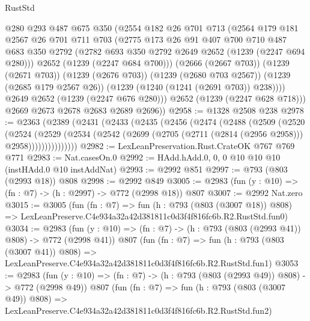 \begin{lexlean}{RustStd}
\begin{coremodule}
            @280
            @293
            @487
            @675
            @350
            (@2554
              @182
              @26
              @701
              @713
              (@2564
                @179
                @181
                @2567
                @26
                @701
                @711
                @703
                (@2775
                  @173
                  @26
                  @91
                  @407
                  @700
                  @710
                  @487
                  @683
                  @350
                  @2792
                  (@2782 @693 @350 @2792 @2649 @2652 (@1239 (@2247 @694 @280)))
                  @2652
                  (@1239 (@2247 @684 @700)))
                (@2666 (@2667 @703))
                (@1239 (@2671 @703))
                (@1239 (@2676 @703))
                (@1239 (@2680 @703 @2567))
                (@1239 (@2685 @179 @2567 @26))
                (@1239 (@1240 (@1241 (@2691 @703)) @238))))
            @2649
            @2652
            (@1239 (@2247 @676 @280)))
          @2652
          (@1239 (@2247 @628 @718)))
        @2669
        @2673
        @2678
        @2683
        @2689
        @2696))
@2958 := @1328 @2508 @238
@2978 := @2363
    (@2389
      (@2431
        (@2433
          (@2435
            (@2456
              (@2474
                (@2488
                  (@2509
                    (@2520
                      (@2524
                        (@2529
                          (@2534
                            (@2542 (@2699 (@2705 (@2711 (@2814 (@2956 @2958))) @2958)))))))))))))))
@2982 := LexLeanPreservation.Rust.CrateOK @767 @769 @771
@2983 := Nat.casesOn.{0}
@2992 := HAdd.hAdd.{0, 0, 0} @10 @10 @10 (instHAdd.{0} @10 instAddNat)
@2993 := @2992 @851
@2997 := @793 (@803 (@2993 @18)) @808
@2998 := @2992 @849
@3005 := @2983 (fun (y : @10) => (fn : @7) -> (h : @2997) -> @772 (@2998 @18)) @807
@3007 := @2992 Nat.zero
@3015 := @3005
    (fun (fn : @7) =>
    fun (h : @793 (@803 (@3007 @18)) @808) =>
    LexLeanPreserve.C4e934a32a42d381811c0d3f4f816fc6b.R2.RustStd.fun0)
@3034 := @2983
    (fun (y : @10) => (fn : @7) -> (h : @793 (@803 (@2993 @41)) @808) -> @772 (@2998 @41))
    @807
    (fun (fn : @7) =>
    fun (h : @793 (@803 (@3007 @41)) @808) =>
    LexLeanPreserve.C4e934a32a42d381811c0d3f4f816fc6b.R2.RustStd.fun1)
@3053 := @2983
    (fun (y : @10) => (fn : @7) -> (h : @793 (@803 (@2993 @49)) @808) -> @772 (@2998 @49))
    @807
    (fun (fn : @7) =>
    fun (h : @793 (@803 (@3007 @49)) @808) =>
    LexLeanPreserve.C4e934a32a42d381811c0d3f4f816fc6b.R2.RustStd.fun2)

\end{coremodule}
\end{lexlean}

